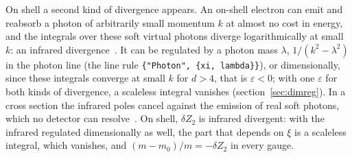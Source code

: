\documentclass[11pt,a4paper]{article}
\newcommand{\pkg}[1]{\texttt{#1}}
\begin{document}
On shell a second kind of divergence appears. An on-shell electron can emit and reabsorb a photon of arbitrarily small
momentum $k$ at almost no cost in energy, and the integrals over these soft virtual photons diverge logarithmically at
small $k$: an infrared divergence~\cite[sections~6.4--6.5]{PeskinSchroeder}. It can be regulated by a photon mass
$\lambda$, $1/(k^2-\lambda^2)$ in the photon line (the line rule \pkg{\{"Photon", \{xi, lambda\}\}}), or dimensionally, since
these integrals converge at small $k$ for $d>4$, that is $\varepsilon<0$; with one $\varepsilon$ for both kinds of
divergence, a scaleless integral vanishes (section~\ref{sec:dimreg}). In a cross section the infrared poles
cancel against the emission of real soft photons, which no detector can resolve~\cite{BlochNordsieck1937}. On shell,
$\delta Z_2$ is infrared divergent: with the infrared regulated dimensionally as well, the part that depends on $\xi$ is a
scaleless integral, which vanishes, and $(m-m_0)/m=-\delta Z_2$ in every gauge.
\end{document}
